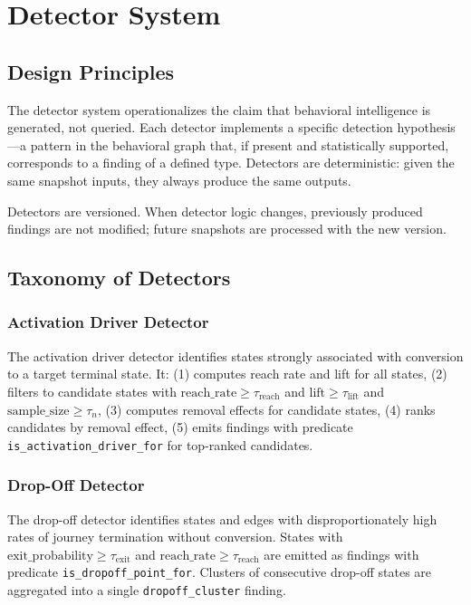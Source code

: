 \documentclass[12pt, a4paper]{article}
\begin{document}
\section{Detector System}
\label{sec:detectors}

\subsection{Design Principles}

The detector system operationalizes the claim that behavioral intelligence is generated, not queried. Each detector implements a specific detection hypothesis---a pattern in the behavioral graph that, if present and statistically supported, corresponds to a finding of a defined type. Detectors are deterministic: given the same snapshot inputs, they always produce the same outputs.

Detectors are versioned. When detector logic changes, previously produced findings are not modified; future snapshots are processed with the new version.

\subsection{Taxonomy of Detectors}

\subsubsection{Activation Driver Detector}

The activation driver detector identifies states strongly associated with conversion to a target terminal state. It: (1) computes reach rate and lift for all states, (2) filters to candidate states with $\text{reach\_rate} \geq \tau_{\text{reach}}$ and $\text{lift} \geq \tau_{\text{lift}}$ and $\text{sample\_size} \geq \tau_n$, (3) computes removal effects for candidate states, (4) ranks candidates by removal effect, (5) emits findings with predicate \texttt{is\_activation\_driver\_for} for top-ranked candidates.

\subsubsection{Drop-Off Detector}

The drop-off detector identifies states and edges with disproportionately high rates of journey termination without conversion. States with $\text{exit\_probability} \geq \tau_{\text{exit}}$ and $\text{reach\_rate} \geq \tau_{\text{reach}}$ are emitted as findings with predicate \texttt{is\_dropoff\_point\_for}. Clusters of consecutive drop-off states are aggregated into a single \texttt{dropoff\_cluster} finding.
\end{document}
